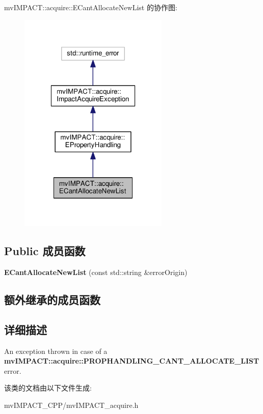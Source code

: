 mv\+I\+M\+P\+A\+C\+T\+:\+:acquire\+:\+:E\+Cant\+Allocate\+New\+List 的协作图\+:
\nopagebreak
\begin{figure}[H]
\begin{center}
\leavevmode
\includegraphics[width=202pt]{classmv_i_m_p_a_c_t_1_1acquire_1_1_e_cant_allocate_new_list__coll__graph}
\end{center}
\end{figure}
\subsection*{Public 成员函数}
\begin{DoxyCompactItemize}
\item 
\hypertarget{classmv_i_m_p_a_c_t_1_1acquire_1_1_e_cant_allocate_new_list_ae5375ed9a57f857496bcce36452452c5}{{\bfseries E\+Cant\+Allocate\+New\+List} (const std\+::string \&error\+Origin)}\label{classmv_i_m_p_a_c_t_1_1acquire_1_1_e_cant_allocate_new_list_ae5375ed9a57f857496bcce36452452c5}

\end{DoxyCompactItemize}
\subsection*{额外继承的成员函数}


\subsection{详细描述}
An exception thrown in case of a {\bfseries mv\+I\+M\+P\+A\+C\+T\+::acquire\+::\+P\+R\+O\+P\+H\+A\+N\+D\+L\+I\+N\+G\+\_\+\+C\+A\+N\+T\+\_\+\+A\+L\+L\+O\+C\+A\+T\+E\+\_\+\+L\+I\+S\+T} error. 

该类的文档由以下文件生成\+:\begin{DoxyCompactItemize}
\item 
mv\+I\+M\+P\+A\+C\+T\+\_\+\+C\+P\+P/mv\+I\+M\+P\+A\+C\+T\+\_\+acquire.\+h\end{DoxyCompactItemize}
